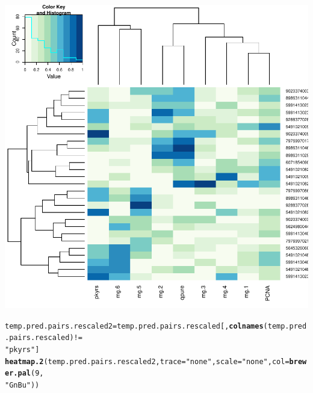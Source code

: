 \documentclass{article}\usepackage[]{graphicx}\usepackage[]{color}
\makeatletter
\def\maxwidth{ %
  \ifdim\Gin@nat@width>\linewidth
    \linewidth
  \else
    \Gin@nat@width
  \fi
}
\newcommand{\hlnum}[1]{\textcolor[rgb]{0.686,0.059,0.569}{#1}}%
\newcommand{\hlstr}[1]{\textcolor[rgb]{0.192,0.494,0.8}{#1}}%
\newcommand{\hlopt}[1]{\textcolor[rgb]{0,0,0}{#1}}%
\newcommand{\hlstd}[1]{\textcolor[rgb]{0.345,0.345,0.345}{#1}}%
\newcommand{\hlkwb}[1]{\textcolor[rgb]{0.69,0.353,0.396}{#1}}%
\newcommand{\hlkwc}[1]{\textcolor[rgb]{0.333,0.667,0.333}{#1}}%
\newcommand{\hlkwd}[1]{\textcolor[rgb]{0.737,0.353,0.396}{\textbf{#1}}}%
\newenvironment{kframe}{%
 \def\at@end@of@kframe{}%
 \ifinner\ifhmode%
  \def\at@end@of@kframe{\end{minipage}}%
  \begin{minipage}{\columnwidth}%
 \fi\fi%
 \def\FrameCommand##1{\hskip\@totalleftmargin \hskip-\fboxsep
 \colorbox{shadecolor}{##1}\hskip-\fboxsep
     \hskip-\linewidth \hskip-\@totalleftmargin \hskip\columnwidth}%
 \MakeFramed {\advance\hsize-\width
   \@totalleftmargin\z@ \linewidth\hsize
   \@setminipage}}%
 {\par\unskip\endMakeFramed%
 \at@end@of@kframe}
\newenvironment{knitrout}{}{} %
\makeatother
\begin{document}
\begin{knitrout}
{\centering \includegraphics[width=\maxwidth]{figure/metagene-pairs-3} 

}


\begin{kframe}\begin{alltt}
\hlstd{temp.pred.pairs.rescaled2} \hlkwb{=} \hlstd{temp.pred.pairs.rescaled[,} \hlkwd{colnames}\hlstd{(temp.pred.pairs.rescaled)} \hlopt{!=}
    \hlstr{"pkyrs"}\hlstd{]}
\hlkwd{heatmap.2}\hlstd{(temp.pred.pairs.rescaled2,} \hlkwc{trace} \hlstd{=} \hlstr{"none"}\hlstd{,} \hlkwc{scale} \hlstd{=} \hlstr{"none"}\hlstd{,} \hlkwc{col} \hlstd{=} \hlkwd{brewer.pal}\hlstd{(}\hlnum{9}\hlstd{,}
    \hlstr{"GnBu"}\hlstd{))}
\end{alltt}
\end{kframe}


\end{knitrout}
\end{document}
